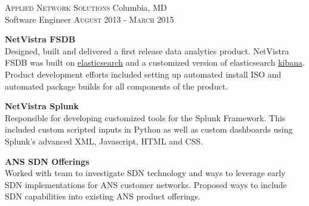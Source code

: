
\textsc{Applied Network Solutions} \hfill Columbia, MD\\
Software Engineer \hfill \textsc{August 2013} - \textsc{March 2015}

\textbf{NetVistra FSDB}\\
Designed, built and delivered a first release data analytics product.  NetVistra
FSDB was built on \href{http://www.elasticsearch.com}{elasticsearch} and a
customized version of elasticsearch
\href{http://www.elasticsearch.org/overview/kibana/}{kibana}.  Product
development efforts included setting up automated install ISO and automated 
package builds for all components of the product.

\textbf{NetVistra Splunk}\\
Responsible for developing customized tools for the Splunk Framework.  This
included custom scripted inputs in Python as well as custom dashboards using
Splunk’s advanced XML, Javascript, HTML and CSS.

\textbf{ANS SDN Offerings}\\
Worked with team to investigate SDN technology and ways to leverage early SDN
implementations for ANS customer networks. Proposed ways to include SDN
capabilities into existing ANS product offerings.


